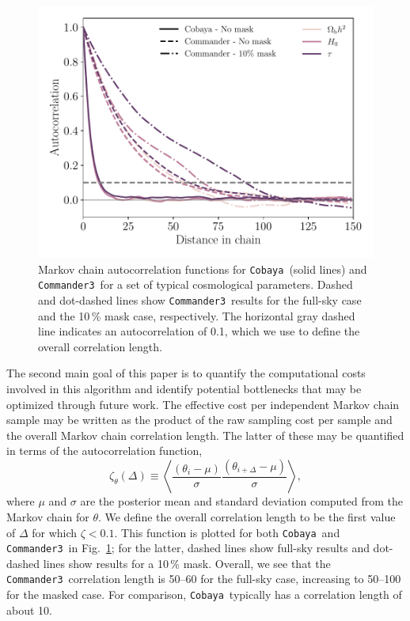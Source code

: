 \documentclass[twocolumn]{aa}
\def\commanderthree{\texttt{Commander3}}
\def\cobaya{\texttt{Cobaya}}
\begin{document}
\begin{figure}
	\centering
	\includegraphics[width=\linewidth]{figures/auto_correlation.pdf}
	\caption{\label{fig:autocorrelation}Markov chain autocorrelation functions for \cobaya\ (solid lines) and \commanderthree\ for a set of typical cosmological parameters. Dashed and dot-dashed lines show \commanderthree\ results for the full-sky case and the 10\,\% mask case, respectively. The horizontal gray dashed line indicates an autocorrelation of 0.1, which we use to define the overall correlation length.   }
\end{figure}

The second main goal of this paper is to quantify the computational costs involved in this algorithm and identify potential bottlenecks that may be optimized through future work. The effective cost per independent Markov chain sample may be written as the product of the raw sampling cost per sample and the overall Markov chain correlation length. The latter of these may be quantified in terms of the autocorrelation function,
\begin{equation}
  \zeta_\theta(\Delta) \equiv \left<\frac{(\theta_i - \mu)}{\sigma}\frac{(\theta_{i+\Delta} - \mu)}{\sigma}\right>,
\end{equation}
where $\mu$ and $\sigma$ are the posterior mean and standard deviation computed from the Markov chain for $\theta$. We define the overall correlation length to be the first value of $\Delta$ for which $\zeta < 0.1$. This function is plotted for both \cobaya\ and \commanderthree\ in Fig.~\ref{fig:autocorrelation}; for the latter, dashed lines show full-sky results and dot-dashed lines show results for a 10\,\% mask. Overall, we see that the \commanderthree\ correlation length is 50--60 for the full-sky case, increasing to 50--100 for the masked case. For comparison, \cobaya\ typically has a correlation length of about 10.
\end{document}
